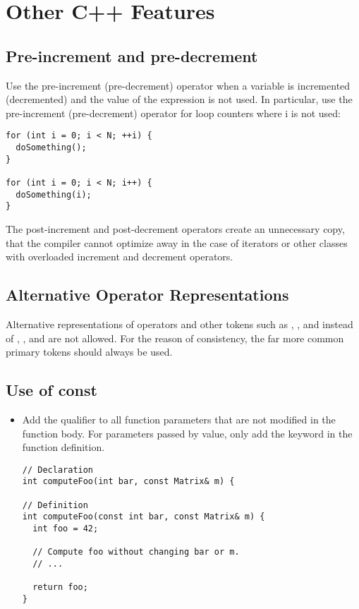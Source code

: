 \section{Other C++ Features}

\subsection{Pre-increment and pre-decrement}

Use the pre-increment (pre-decrement) operator when a variable is incremented (decremented) and the value of the expression is not used.
In particular, use the pre-increment (pre-decrement) operator for loop counters where i is not used:

\begin{lstlisting}[showspaces=false]
for (int i = 0; i < N; ++i) {
  doSomething();
}

for (int i = 0; i < N; i++) {
  doSomething(i);
}
\end{lstlisting}

The post-increment and post-decrement operators create an unnecessary copy, that the compiler cannot optimize away in the case of iterators or other classes with overloaded increment and decrement operators.

\subsection{Alternative Operator Representations}

Alternative representations of operators and other tokens such as , , and  instead of \inlinecode{&&}, \inlinecode{||}, and \inlinecode{!} are not allowed.
For the reason of consistency, the far more common primary tokens should always be used.

\subsection{Use of const}

\begin{itemize}

\item Add the  qualifier to all function parameters that are not modified in the function body.
For parameters passed by value, only add the keyword in the function definition.

\begin{lstlisting}[showspaces=false]
// Declaration
int computeFoo(int bar, const Matrix& m) {

// Definition
int computeFoo(const int bar, const Matrix& m) {
  int foo = 42;

  // Compute foo without changing bar or m.
  // ...

  return foo;
}
\end{lstlisting}

\end{itemize}

